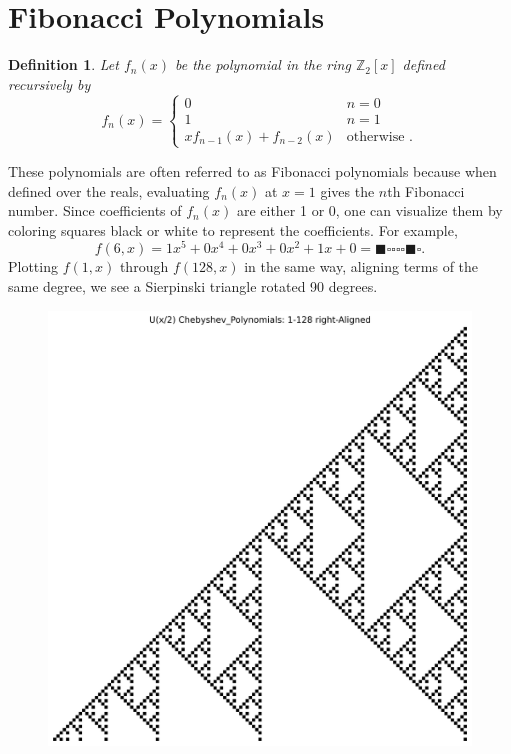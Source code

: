 \documentclass[a4paper]{article}
\newtheorem{definition}{Definition}
\newcommand{\Z}{\mathbb{Z}}
\begin{document}
	\section{Fibonacci Polynomials}
	\begin{definition}
		Let $f_n(x)$ be the polynomial in the ring $\Z_2[x]$ defined recursively by
		\begin{equation*}
			f_n(x) = \begin{cases}
				0 & n=0 \\
				1 & n=1 \\
				xf_{n-1}(x) + f_{n-2}(x) & \text{otherwise }.
			\end{cases}
		\end{equation*}
	\end{definition}
	These polynomials are often referred to as Fibonacci polynomials because when defined over the reals, evaluating $f_n(x)$ at $x=1$ gives the $n$th Fibonacci number.
	Since coefficients of $f_n(x)$ are either 1 or 0, one can visualize them by coloring squares black or white to represent the coefficients.
	For example,
	\begin{equation*}
		f(6,x) = 1x^5 + 0x^4 + 0x^3 + 0x^2 + 1x + 0 = \blacksquare\square\square\square\square\blacksquare\square.
	\end{equation*}
	Plotting $f(1,x)$ through $f(128,x)$ in the same way, aligning terms of the same degree, we see a Sierpinski triangle rotated 90 degrees.
	
	\begin{figure}[H]
		\centering
		\includegraphics[width=.8\textwidth]{./chebyshev1_right_128.png}	
	\end{figure}
	
\end{document}

